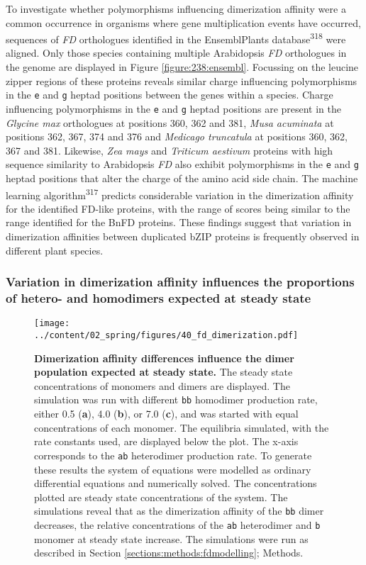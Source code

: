 \documentclass[12pt,]{book}
\begin{document}
To investigate whether polymorphisms influencing dimerization affinity
were a common occurrence in organisms where gene multiplication events
have occurred, sequences of \emph{FD} orthologues identified in the
EnsemblPlants database\textsuperscript{318} were aligned. Only those
species containing multiple Arabidopsis \emph{FD} orthologues in the
genome are displayed in Figure \ref{figure:238:ensembl}. Focussing on
the leucine zipper regions of these proteins reveals similar charge
influencing polymorphisms in the \texttt{e} and \texttt{g} heptad
positions between the genes within a species. Charge influencing
polymorphisms in the \texttt{e} and \texttt{g} heptad positions are
present in the \emph{Glycine max} orthologues at positions 360, 362 and
381, \emph{Musa acuminata} at positions 362, 367, 374 and 376 and
\emph{Medicago truncatula} at positions 360, 362, 367 and 381. Likewise,
\emph{Zea mays} and \emph{Triticum aestivum} proteins with high sequence
similarity to Arabidopsis \emph{FD} also exhibit polymorphisms in the
\texttt{e} and \texttt{g} heptad positions that alter the charge of the
amino acid side chain. The machine learning
algorithm\textsuperscript{317} predicts considerable variation in the
dimerization affinity for the identified FD-like proteins, with the
range of scores being similar to the range identified for the BnFD
proteins. These findings suggest that variation in dimerization
affinities between duplicated bZIP proteins is frequently observed in
different plant species.

\subsubsection{Variation in dimerization affinity influences the
proportions of hetero- and homodimers expected at steady
state}\label{variation-in-dimerization-affinity-influences-the-proportions-of-hetero--and-homodimers-expected-at-steady-state}

\begin{figure}[htbp]
\centering
\texttt{[image: ../content/02\_spring/figures/40\_fd\_dimerization.pdf]}
\caption{\textbf{Dimerization affinity differences influence the dimer
population expected at steady state.} The steady state concentrations of
monomers and dimers are displayed. The simulation was run with different
\texttt{bb} homodimer production rate, either 0.5 (\textbf{a}), 4.0
(\textbf{b}), or 7.0 (\textbf{c}), and was started with equal
concentrations of each monomer. The equilibria simulated, with the rate
constants used, are displayed below the plot. The x-axis corresponds to
the \texttt{ab} heterodimer production rate. To generate these results
the system of equations were modelled as ordinary differential equations
and numerically solved. The concentrations plotted are steady state
concentrations of the system. The simulations reveal that as the
dimerization affinity of the \texttt{bb} dimer decreases, the relative
concentrations of the \texttt{ab} heterodimer and \texttt{b} monomer at
steady state increase. The simulations were run as described in Section
\ref{sections:methods:fdmodelling};
Methods.}\label{figure:240:dimerizationmodelling}
\end{figure}
\end{document}
